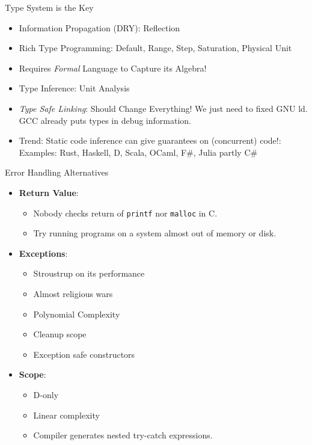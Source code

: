 \documentclass[xcolor=dvipsnames]{beamer}
\begin{document}
\begin{frame}[fragile]{Type System is the Key}
  \begin{itemize}[<+->]
  \item Information Propagation (DRY): Reflection
  \item Rich Type Programming: Default, Range, Step, Saturation, Physical Unit
  \item Requires \emph{Formal} Language to Capture its Algebra!
  \item Type Inference: Unit Analysis
  \item \emph{Type Safe Linking}: Should Change Everything! We just need to
    fixed GNU ld. GCC already puts types in debug information.
  \item Trend: Static code inference can give guarantees on
    (concurrent) code!:\\
    Examples: Rust, Haskell, D, Scala, OCaml, F\#, Julia partly C\#
  \end{itemize}
\end{frame}

\begin{frame}[fragile]{Error Handling Alternatives}
  \begin{itemize}[<+->]
  \item \textbf{Return Value}:
    \begin{itemize}[<+->]
    \item Nobody checks return of \texttt{printf} nor \texttt{malloc} in C.
    \item Try running programs on a system almost out of memory or disk.
    \end{itemize}
  \item \textbf{Exceptions}:
    \begin{itemize}[<+->]
    \item Stroustrup on its performance
    \item Almost religious wars
    \item Polynomial Complexity
    \item Cleanup scope
    \item Exception safe constructors
    \end{itemize}
  \item \textbf{Scope}:
    \begin{itemize}[<+->]
    \item D-only
    \item Linear complexity
    \item Compiler generates nested try-catch expressions.
    \end{itemize}
  \end{itemize}
\end{frame}
\end{document}
